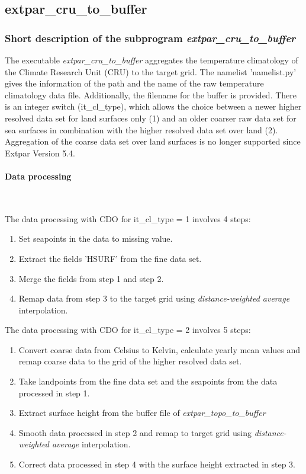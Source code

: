 \documentclass[a4paper,10pt,DIV14,BCOR1cm,titlepage,twoside]{scrartcl}
\begin{document}
\subsection{extpar\_cru\_to\_buffer}\label{extpar_cru_to_buffer}
\subsubsection{Short description of the subprogram \textit{extpar\_cru\_to\_buffer}}
The executable \textit{extpar\_cru\_to\_buffer} aggregates the temperature climatology of the Climate Research Unit (CRU) to the target grid. 
The namelist 'namelist.py' gives the information of the path and the name of the raw temperature climatology data file. Additionally, the filename for the buffer is provided. There is an integer switch (it\_cl\_type), which allows the choice between a newer higher resolved data set for land surfaces only (1) and an older coarser raw data set for sea surfaces in combination with the  higher resolved data set over land (2). Aggregation of the coarse data set over land surfaces is no longer supported since Extpar Version 5.4. \par\medskip\noindent

\paragraph{Data processing} \ \par\medskip\noindent

\noindent The data processing with CDO for it\_cl\_type = 1 involves 4 steps:
\begin{enumerate}
  \item Set seapoints in the data to missing value.
  \item Extract the fields 'HSURF' from the fine data set.
  \item Merge the fields from step 1 and step 2.
  \item Remap data from step 3 to the target grid using \textit{distance-weighted average} interpolation. 
\end{enumerate}

\noindent The data processing with CDO for it\_cl\_type = 2 involves 5 steps:
\begin{enumerate}
  \item Convert coarse data from Celsius to Kelvin, calculate yearly mean values and remap coarse data to the grid of the higher resolved data set.
  \item Take landpoints from the fine data set and the seapoints from the data processed in step 1.
  \item Extract surface height from the buffer file of \textit{extpar\_topo\_to\_buffer}
  \item Smooth data processed in step 2 and remap to target grid using \textit{distance-weighted average} interpolation. 
  \item Correct data processed in step 4 with the surface height extracted in step 3.
\end{enumerate}
\end{document}
